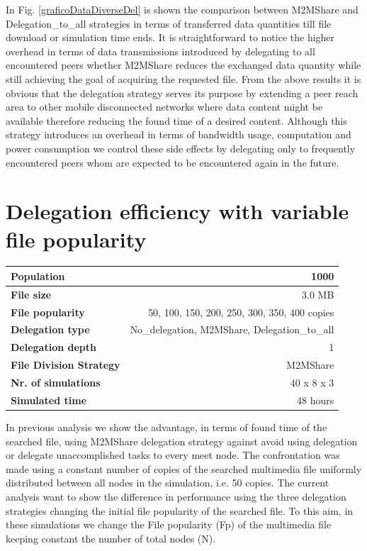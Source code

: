 In Fig. \ref{graficoDataDiverseDel} is shown the comparison between M2MShare and Delegation\_to\_all strategies in terms of transferred data quantities till file download or simulation time ends. It is straightforward to notice the higher overhead in terms of data transmissions introduced by delegating to all encountered peers whether M2MShare reduces the exchanged data quantity while still achieving the goal of acquiring the requested file. From the above results it is obvious that the delegation strategy serves its purpose by extending a peer reach area to other mobile disconnected networks where data content might be available therefore reducing the found time of a desired content.
Although this strategy introduces an overhead in terms of bandwidth usage, computation and power consumption we control these side effects by delegating only to frequently encountered peers whom are expected to be encountered again in the future.



\newpage 
\section{Delegation efficiency with variable file popularity}
\begin{table}[h]
\begin{center}
\begin{tabular}{|l|r|}
\hline
\bfseries Population & 1000 \\
\hline
\bfseries File size & 3.0 MB \\
\hline
\bfseries File popularity & 50, 100, 150, 200, 250, 300, 350, 400 copies \\
\hline
\bfseries Delegation type & No\_delegation, M2MShare, Delegation\_to\_all \\
\hline
\bfseries Delegation depth & 1 \\
\hline
\bfseries File Division Strategy & M2MShare \\
\hline
\bfseries Nr. of simulations & 40 x 8 x 3\\
\hline
\bfseries Simulated time & 48 hours \\
\hline
\end{tabular}
\end{center}
\end{table}
In previous analysis we show the advantage, in terms of found time of the searched file, using M2MShare delegation strategy against avoid using delegation or delegate unaccomplished tasks to every meet node. The confrontation was made using a constant number of copies of the searched multimedia file uniformly distributed between all nodes in the simulation, i.e. 50 copies. The current analysis want to show the difference in performance using the three delegation strategies changing the initial file popularity of the searched file. To this aim, in these simulations we change the File popularity (Fp) of the multimedia file keeping constant the number of total nodes (N).

